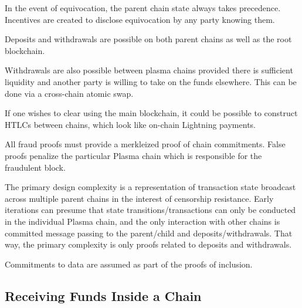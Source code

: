 \documentclass[letterpaper, 11pt]{article}
\begin{document}
In the event of equivocation, the parent chain state always takes precedence.
Incentives are created to disclose equivocation by any party knowing them.

Deposits and withdrawals are possible on both parent chains as well as the root
blockchain.

Withdrawals are also possible between plasma chains provided there is sufficient
liquidity and another party is willing to take on the funds elsewhere. This can
be done via a cross-chain atomic swap.

If one wishes to clear using the main blockchain, it could be possible to
construct HTLCs between chains, which look like on-chain Lightning payments.

All fraud proofs must provide a merkleized proof of chain commitments. False
proofs penalize the particular Plasma chain which is responsible for the
fraudulent block.

The primary design complexity is a representation of transaction state broadcast
across multiple parent chains in the interest of censorship resistance. Early
iterations can presume that state transitions/transactions can only be conducted
in the individual Plasma chain, and the only interaction with other chains is
committed message passing to the parent/child and deposits/withdrawals. That
way, the primary complexity is only proofs related to deposits and withdrawals.

Commitments to data are assumed as part of the proofs of inclusion.

\subsection{Receiving Funds Inside a Chain}
\end{document}
